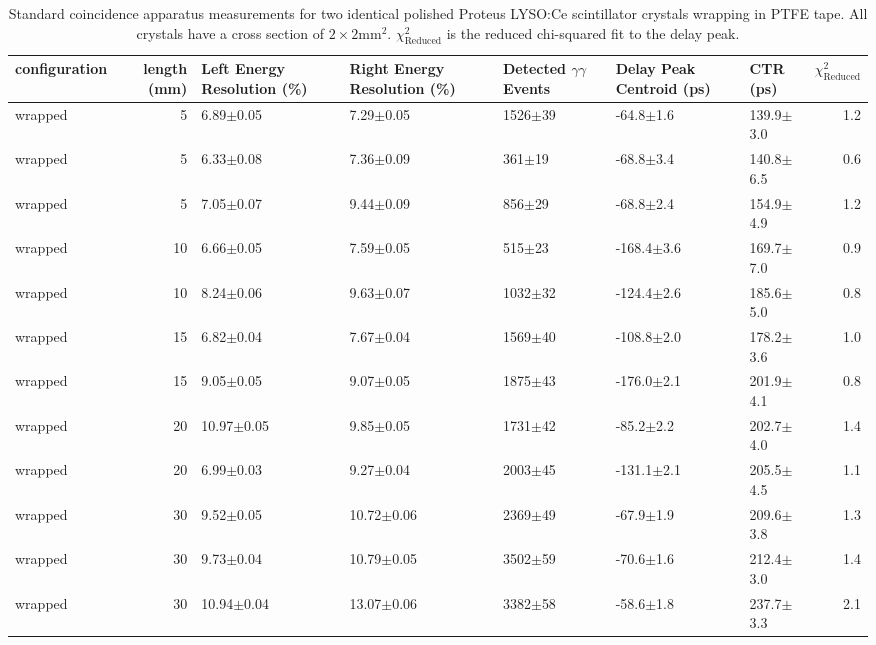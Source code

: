 \begin{table}
\caption{\label{tab:standardctr} Standard coincidence apparatus measurements for two identical polished Proteus LYSO:Ce scintillator crystals wrapping in PTFE tape. All crystals have a cross section of $2\times2$mm$^2$. $\chi^2_\text{Reduced}$ is the reduced chi-squared fit to the delay peak.}
\begin{tabular}{lrlllllr}
configuration &  length (mm) & Left Energy Resolution (\%) & Right Energy Resolution (\%) & Detected $\gamma\gamma$ Events & Delay Peak Centroid (ps) & CTR (ps) &  $\chi^2_\text{Reduced}$ \\
\hline
      wrapped &      5 &   6.89$\pm$0.05 &   7.29$\pm$0.05 &  1526$\pm$39 &   -64.8$\pm$1.6 &  139.9$\pm$3.0 &        1.2 \\
      wrapped &      5 &   6.33$\pm$0.08 &   7.36$\pm$0.09 &   361$\pm$19 &   -68.8$\pm$3.4 &  140.8$\pm$6.5 &        0.6 \\
      wrapped &      5 &   7.05$\pm$0.07 &   9.44$\pm$0.09 &   856$\pm$29 &   -68.8$\pm$2.4 &  154.9$\pm$4.9 &        1.2 \\
      wrapped &     10 &   6.66$\pm$0.05 &   7.59$\pm$0.05 &   515$\pm$23 &  -168.4$\pm$3.6 &  169.7$\pm$7.0 &        0.9 \\
      wrapped &     10 &   8.24$\pm$0.06 &   9.63$\pm$0.07 &  1032$\pm$32 &  -124.4$\pm$2.6 &  185.6$\pm$5.0 &        0.8 \\
      wrapped &     15 &   6.82$\pm$0.04 &   7.67$\pm$0.04 &  1569$\pm$40 &  -108.8$\pm$2.0 &  178.2$\pm$3.6 &        1.0 \\
      wrapped &     15 &   9.05$\pm$0.05 &   9.07$\pm$0.05 &  1875$\pm$43 &  -176.0$\pm$2.1 &  201.9$\pm$4.1 &        0.8 \\
      wrapped &     20 &  10.97$\pm$0.05 &   9.85$\pm$0.05 &  1731$\pm$42 &   -85.2$\pm$2.2 &  202.7$\pm$4.0 &        1.4 \\
      wrapped &     20 &   6.99$\pm$0.03 &   9.27$\pm$0.04 &  2003$\pm$45 &  -131.1$\pm$2.1 &  205.5$\pm$4.5 &        1.1 \\
      wrapped &     30 &   9.52$\pm$0.05 &  10.72$\pm$0.06 &  2369$\pm$49 &   -67.9$\pm$1.9 &  209.6$\pm$3.8 &        1.3 \\
      wrapped &     30 &   9.73$\pm$0.04 &  10.79$\pm$0.05 &  3502$\pm$59 &   -70.6$\pm$1.6 &  212.4$\pm$3.0 &        1.4 \\
      wrapped &     30 &  10.94$\pm$0.04 &  13.07$\pm$0.06 &  3382$\pm$58 &   -58.6$\pm$1.8 &  237.7$\pm$3.3 &        2.1 \\
\hline
\end{tabular}
\end{table}



